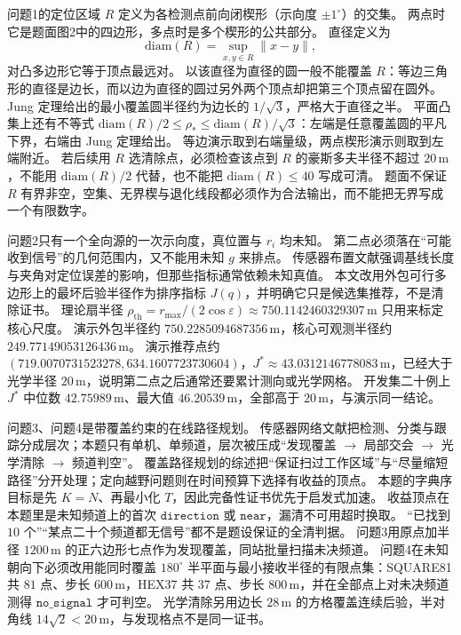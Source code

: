 问题1的定位区域 $R$ 定义为各检测点前向闭楔形（示向度 $\pm 1^\circ$）的交集。
两点时它是题面图2中的四边形，多点时是多个楔形的公共部分。
直径定义为
\begin{equation}
\mathrm{diam}(R)=\sup_{x,y\in R}\|x-y\|,
\end{equation}
对凸多边形它等于顶点最远对。
以该直径为直径的圆一般不能覆盖 $R$：等边三角形的直径是边长，而以边为直径的圆过另外两个顶点却把第三个顶点留在圆外。
Jung 定理给出的最小覆盖圆半径约为边长的 $1/\sqrt{3}$，严格大于直径之半。
平面凸集上还有不等式 $\mathrm{diam}(R)/2\le\rho_\ast\le\mathrm{diam}(R)/\sqrt{3}$：左端是任意覆盖圆的平凡下界，右端由 Jung 定理给出。
等边演示取到右端量级，两点楔形演示则取到左端附近。
若后续用 $R$ 选清除点，必须检查该点到 $R$ 的豪斯多夫半径不超过 $20\,\mathrm{m}$，不能用 $\mathrm{diam}(R)/2$ 代替，也不能把 $\mathrm{diam}(R)\le 40$ 写成可清。
题面不保证 $R$ 有界非空，空集、无界楔与退化线段都必须作为合法输出，而不能把无界写成一个有限数字。

问题2只有一个全向源的一次示向度，真位置与 $r_i$ 均未知。
第二点必须落在“可能收到信号”的几何范围内，又不能用未知 $g$ 来排点。
传感器布置文献强调基线长度与夹角对定位误差的影响，但那些指标通常依赖未知真值。
本文改用外包可行多边形上的最坏后验半径作为排序指标 $J(q)$，并明确它只是候选集推荐，不是清除证书。
理论扇半径 $\rho_{\mathrm{th}}=r_{\max}/(2\cos\varepsilon)\approx 750.1142460329307\,\mathrm{m}$ 只用来标定核心尺度。
演示外包半径约 $750.2285094687356\,\mathrm{m}$，核心可观测半径约 $249.77149053126436\,\mathrm{m}$。
演示推荐点约 $(719.0070731523278,634.1607723730604)$，$J^\ast\approx 43.0312146778083\,\mathrm{m}$，已经大于光学半径 $20\,\mathrm{m}$，说明第二点之后通常还要累计测向或光学网格。
开发集二十例上 $J^\ast$ 中位数 $42.75989\,\mathrm{m}$、最大值 $46.20539\,\mathrm{m}$，全部高于 $20\,\mathrm{m}$，与演示同一结论。

问题3、问题4是带覆盖约束的在线路径规划。
传感器网络文献把检测、分类与跟踪分成层次；本题只有单机、单频道，层次被压成“发现覆盖 $\to$ 局部交会 $\to$ 光学清除 $\to$ 频道判空”。
覆盖路径规划的综述把“保证扫过工作区域”与“尽量缩短路径”分开处理；定向越野问题则在时间预算下选择有收益的顶点。
本题的字典序目标是先 $K=N$、再最小化 $T$，因此完备性证书优先于启发式加速。
收益顶点在本题里是未知频道上的首次 $\mathtt{direction}$ 或 $\mathtt{near}$，漏清不可用超时换取。
“已找到 $10$ 个”“某点二十个频道都无信号”都不是题设保证的全清判据。
问题3用原点加半径 $1200\,\mathrm{m}$ 的正六边形七点作为发现覆盖，同站批量扫描未决频道。
问题4在未知朝向下必须改用能同时覆盖 $180^\circ$ 半平面与最小接收半径的有限点集：SQUARE81 共 $81$ 点、步长 $600\,\mathrm{m}$，HEX37 共 $37$ 点、步长 $800\,\mathrm{m}$，并在全部点上对未决频道测得 $\mathtt{no\_signal}$ 才可判空。
光学清除另用边长 $28\,\mathrm{m}$ 的方格覆盖连续后验，半对角线 $14\sqrt{2}<20\,\mathrm{m}$，与发现格点不是同一证书。


